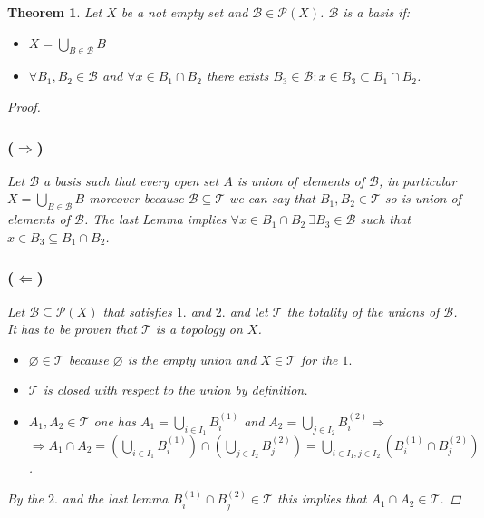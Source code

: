 \documentclass{article}
\newtheorem{theorem}{Theorem}
\begin{document}
    \begin{theorem}
        Let $X$ be a not empty set and $\mathcal{B} \in \mathcal{P}(X)$. $\mathcal{B}$ is a basis if:
        \begin{itemize}
            \item[$1.$] $X = \bigcup_{B\in \mathcal{B}}B$
            \item[$2.$] $\forall B_1, B_2 \in \mathcal{B}$ and $\forall x \in B_1 \cap B_2$ there exists $B_3 \in \mathcal{B} : x\in B_3 \subset B_1\cap B_2 $. 
        \end{itemize}
        \begin{proof}
            \subsubsection*{($\Rightarrow$)}
                Let $\mathcal{B}$ a basis such that every open set $A$ is union of elements of $\mathcal{B}$, in particular $X = \bigcup_{B\in \mathcal{B}}B$ moreover because $\mathcal{B} \subseteq \mathcal{T}$ we can say that $B_1,B_2 \in \mathcal{T}$ so is union of elements of $\mathcal{B}$. The last Lemma implies $\forall x \in B_1\cap B_2 \ \exists B_3 \in \mathcal{B}$ such that $x\in B_3 \subseteq B_1 \cap B_2$.
            \subsubsection*{($\Leftarrow$)}
                Let $\mathcal{B} \subseteq \mathcal{P}(X)$ that satisfies $1.$ and $2.$ and let $\mathcal{T}$ the totality of the unions of $\mathcal{B}$. It has to be proven that $\mathcal{T}$ is a topology on $X$.
                \begin{itemize}
                    \item[i] $\varnothing \in \mathcal{T}$ because $\varnothing$ is the empty union and $X \in \mathcal{T}$ for the $1.$
                    \item[ii] $\mathcal{T}$ is closed with respect to the union by definition.
                    \item[iii] $A_1,A_2 \in \mathcal{T}$ one has $A_1 = \bigcup_{i \in I_1}B_i^{(1)}$ and $A_2 = \bigcup_{j\in I_2}B_i^{(2)} \Rightarrow$ \\ $ \Rightarrow  A_1\cap A_2 = ( \bigcup_{i \in I_1}B_i^{(1)} ) \cap ( \bigcup_{j \in I_2}B_j^{(2)} ) = \bigcup_{i \in I_1, j \in I_2} ( B_i^{(1)} \cap B_j^{(2)})$.  
                \end{itemize} 
                By the $2.$ and the last lemma $ B_i^{(1)} \cap B_j^{(2)} \in \mathcal{T}$ this implies that $A_1 \cap A_2 \in \mathcal{T}$.
        \end{proof}
    \end{theorem}
\end{document}
